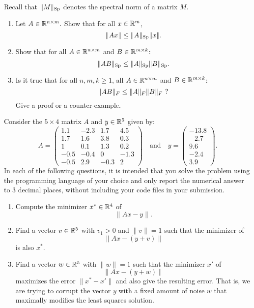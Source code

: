 \documentclass[11pt,nocut]{article}
\begin{document}
\begin{problem}[3 points]
	Recall that $\|M\|_{\rm Sp}$ denotes the spectral norm of a matrix $M$.
	\begin{enumerate}[label=\normalfont(\textbf{\alph*})]
		\item Let $A\in \mathbb{R}^{n \times m}.$ Show that for all $x \in \mathbb{R}^m$,
			$$
			\|Ax\| \leq \|A\|_{\rm Sp} \|x\|.
			$$
		\item Show that for all $A \in \mathbb{R}^{n \times m}$ and $B\in \mathbb{R}^{m \times k}$:
			$$
			\|AB\|_{\rm Sp} \leq \|A\|_{\rm Sp} \|B\|_{\rm Sp}.
			$$
		\item Is it true that for all $n,m,k \geq 1$, all $A \in \mathbb{R}^{n \times m}$ and $B\in \mathbb{R}^{m \times k}$:
			$$
			\|AB\|_{F} \leq \|A\|_{F} \|B\|_{F} \ {\rm ?}
			$$
			Give a proof or a counter-example.
	\end{enumerate}
\end{problem}

\newpage

\begin{problem}[3 points]
 Consider the $5 \times 4$ matrix $A$ and $y \in \mathbb{R}^5$ given by:
$$
A=
\begin{pmatrix}
	1.1 & -2.3 & 1.7 &  4.5\\
	1.7  & 1.6  & 3.8  & 0.3 \\
	1  &  0.1 & 1.3&  0.2\\
	-0.5 & -0.4  & 0 &  -1.3 \\
	-0.5  & 2.9 & -0.3 &  2
\end{pmatrix}
\quad \text{and} \quad
y=
\begin{pmatrix}
	-13.8\\
	-2.7 \\
	9.6 \\
	-2.4 \\
	3.9
\end{pmatrix}
.
$$
In each of the following questions, it is intended that you solve the problem using the programming language of your choice and only report the numerical answer to 3 decimal places, without including your code files in your submission.
\begin{enumerate}[label=\normalfont(\textbf{\alph*})]
	\item Compute the minimizer $x^* \in \mathbb{R}^4$ of 
		$$
		\|Ax-y\|.
		$$
	\item Find a vector $v \in\mathbb{R}^5$ with $v_1 > 0$ and $\|v\|=1$ such that the minimizer of 
		$$
		\|Ax - (y+v)\|
		$$
		is also $x^*$.
	\item Find a vector $w \in \mathbb{R}^5$ with $\|w\|=1$ such that the minimizer $x'$ of 
		$$
		\|Ax - (y+w)\|
		$$
		maximizes the error $\|x^* - x'\|$ and also	give the resulting error.
		That is, we are trying to corrupt the vector $y$ with a fixed amount of noise $w$ that maximally modifies the least squares solution.
\end{enumerate}
\end{problem}
\end{document}
